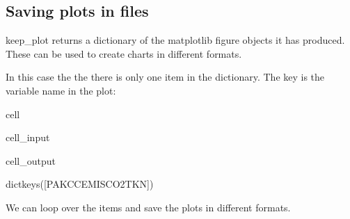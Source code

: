 \documentclass[letterpaper,10pt,english]{jupyterBook}
\begin{document}
\subsection{Saving plots in files}
\label{\detokenize{content/howto/experiments/create_save_scenarios:saving-plots-in-files}}
\sphinxAtStartPar
keep\_plot returns a dictionary of the matplotlib figure objects it has produced. These can be used to create charts in different formats.

\sphinxAtStartPar
In this case the the there is only one
item in the dictionary. The key is the variable name in the plot:

\begin{sphinxuseclass}{cell}\begin{sphinxVerbatimInput}

\begin{sphinxuseclass}{cell_input}
\begin{sphinxVerbatim}[commandchars=\\\{\}]
\end{sphinxVerbatim}

\end{sphinxuseclass}\end{sphinxVerbatimInput}
\begin{sphinxVerbatimOutput}

\begin{sphinxuseclass}{cell_output}
\begin{sphinxVerbatim}[commandchars=\\\{\}]
dict\PYGZus{}keys([\PYGZsq{}PAKCCEMISCO2TKN\PYGZsq{}])
\end{sphinxVerbatim}

\end{sphinxuseclass}\end{sphinxVerbatimOutput}

\end{sphinxuseclass}
\sphinxAtStartPar
We can loop over the items and save the plots in different formats.
\end{document}
